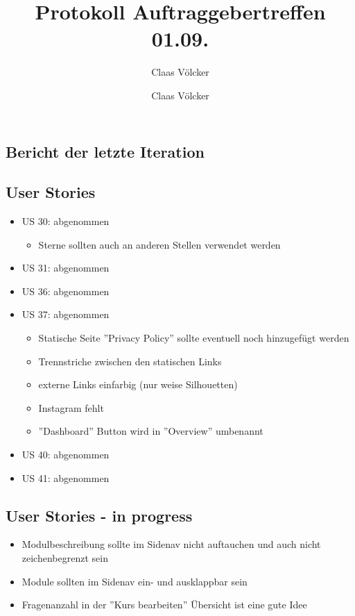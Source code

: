 \documentclass[colorback, accentcolor=tud1c, paper=a4]{tudexercise}
\title{Protokoll Auftraggebertreffen 01.09.}
\subtitle{Claas Völcker}
\author{Claas Völcker}
\begin{document}
\maketitle

\begin{multicols}{2}

\section*{Bericht der letzte Iteration}
\subsection*{User Stories}
\begin{itemize}
	\item US 30: abgenommen
	\begin{itemize}
		\item Sterne sollten auch an anderen Stellen verwendet werden
	\end{itemize}
	\item US 31: abgenommen
	\item US 36: abgenommen
	\item US 37: abgenommen
	\begin{itemize}
		\item Statische Seite ''Privacy Policy'' sollte eventuell noch hinzugefügt werden
		\item Trennstriche zwischen den statischen Links
		\item externe Links einfarbig (nur weise Silhouetten)
		\item Instagram fehlt
		\item ''Dashboard'' Button wird in ''Overview'' umbenannt
	\end{itemize}
	\item US 40: abgenommen	
	\item US 41: abgenommen
\end{itemize}

\subsection*{User Stories - in progress}
\begin{itemize}
	\item Modulbeschreibung sollte im Sidenav nicht auftauchen und auch nicht zeichenbegrenzt sein
	\item Module sollten im Sidenav ein- und ausklappbar sein
	\item Fragenanzahl in der ''Kurs bearbeiten'' Übersicht ist eine gute Idee
\end{itemize}


\end{multicols}
\end{document}
